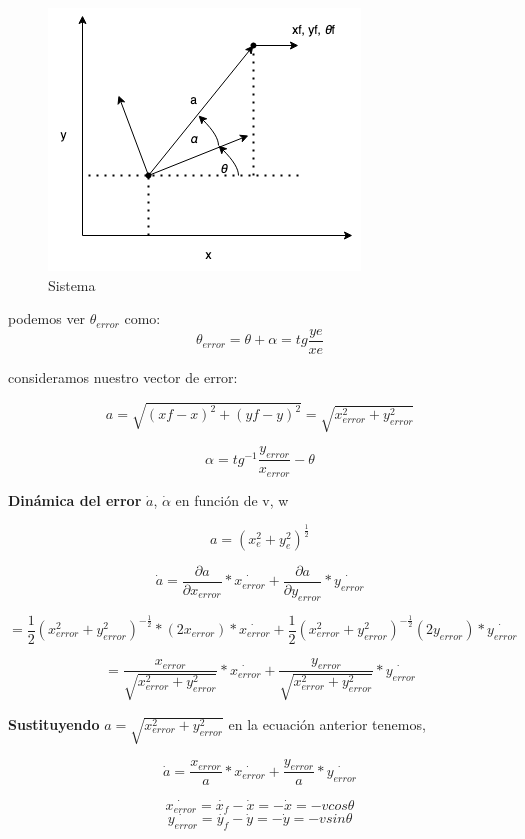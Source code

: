 \documentclass[oneside,onecolumn]{article}
\begin{document}
\begin{figure}[h]
  \centering
  \includegraphics[scale=0.7]{graficos/grafico.png}
  \caption{Sistema}
\end{figure}

podemos ver $\theta_{error}$ como: \\
\[ \theta_{error} = \theta + \alpha = tg \frac{ye}{xe} \]

consideramos nuestro vector de error:

\[ a = \sqrt{(xf-x)^{2}+(yf-y)^2} = \sqrt{x_{error}^{2} + y_{error}^2} \]

\[ \alpha = tg^{-1} \frac{y_{error}}{x_{error}} - \theta\]

\textbf{Dinámica del error} $\dot{a}$, $\dot{\alpha}$ en función de v, w

\[ a = (x_{e}^{2} + y_{e}^{2})^{\frac{1}{2}}\]

\[ \dot{a} = \frac{\partial a}{\partial x_{error}}*\dot{x_{error}} + \frac{\partial a}{\partial y_{error}}*\dot{y_{error}}\]

\[ = \frac{1}{2} (x_{error}^{2} + y_{error}^{2})^{-\frac{1}{2}}*(2x_{error})*\dot{x_{error}} + \frac{1}{2} (x_{error}^{2}+y_{error}^2)^{-\frac{1}{2}}(2y_{error})*\dot{y_{error}}\]

\[ = \frac{x_{error}}{\sqrt{x_{error}^{2} + y_{error}^2}}*\dot{x_{error}} + \frac{y_{error}}{\sqrt{x_{error}^{2} + y_{error}^2}}*\dot{y_{error}}\]

\textbf{Sustituyendo} $a=\sqrt{x_{error}^2 + y_{error}^2}$ en la ecuación anterior tenemos,

\[ \dot{a} = \frac{x_{error}}{a} * \dot{x_{error}} + \frac{y_{error}}{a} * \dot{y_{error}}\]

\[ \dot{x_{error}} = \dot{x_{f}} - \dot{x} = -\dot{x} = -v cos \theta\]
\[ \dot{y_{error}} = \dot{y_{f}} - \dot{y} = -\dot{y} = -v sin \theta\]
\end{document}
